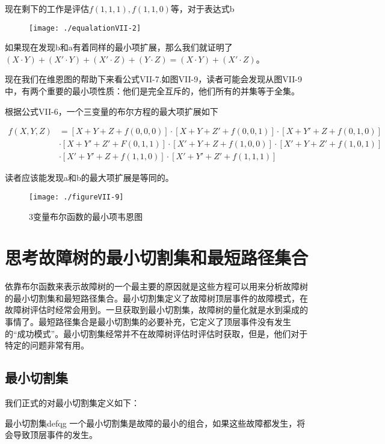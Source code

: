 \documentclass[cn,11pt,chinese]{elegantbook}
\begin{document}
{现在剩下的工作是评估$f(1,1,1),f(1,1,0)$等，对于表达式b

\begin{figure}[H]
	\texttt{[image: ./equalationVII-2]}
\end{figure}


如果现在发现b和a有着同样的最小项扩展，那么我们就证明了$(X\cdot Y)+(X'\cdot Y)+(X' \cdot Z)+(Y\cdot Z)=(X\cdot Y)+(X' \cdot Z)$。

现在我们在维恩图的帮助下来看公式VII-7.如图VII-9，读者可能会发现从图VII-9中，有两个重要的最小项性质：他们是完全互斥的，他们所有的并集等于全集。

根据公式VII-6，一个三变量的布尔方程的最大项扩展如下

\begin{align}
\label{eq7-8}
f(X,Y,Z) &=[X+Y+Z+f(0,0,0)]\cdot[X+Y+Z'+f(0,0,1)]\cdot[X+Y'+Z+f(0,1,0)]   \nonumber\\
&\cdot[X+Y'+Z'+F(0,1,1)]\cdot[X'+Y+Z+f(1,0,0)]\cdot[X'+Y+Z'+f(1,0,1)]    \nonumber\\
&\cdot[X'+Y'+Z+f(1,1,0)]\cdot[X'+Y'+Z'+f(1,1,1)]
\end{align}

读者应该能发现a和b的最大项扩展是等同的。

\begin{figure}
	\centering
	\texttt{[image: ./figureVII-9]}
	\caption{3变量布尔函数的最小项韦恩图}
\end{figure}

\section{思考故障树的最小切割集和最短路径集合}

依靠布尔函数来表示故障树的一个最主要的原因就是这些方程可以用来分析故障树的最小切割集和最短路径集合。最小切割集定义了故障树顶层事件的故障模式，在故障树评估时经常会用到。一旦获取到最小切割集，故障树的量化就是水到渠成的事情了。最短路径集合是最小切割集的必要补充，它定义了顶层事件没有发生的“成功模式”。最小切割集经常并不在故障树评估时评估时获取，但是，他们对于特定的问题非常有用。

\subsection{最小切割集}

我们正式的对最小切割集定义如下：

\begin{definition}{最小切割集}{defqg}
	一个最小切割集是故障的最小的组合，如果这些故障都发生，将会导致顶层事件的发生。
\end{definition}

}
\end{document}
